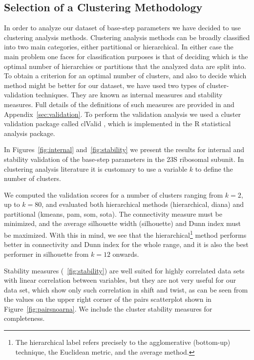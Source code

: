 \subsection{Selection of a Clustering Methodology} 
In  order to  analyze  our  dataset of  base-step  parameters we  have
decided  to  use  clustering  analysis methods.   Clustering  analysis
methods  can be broadly  classified into  two main  categories, either
partitional  or hierarchical.   In either  case the  main  problem one
faces for  classification purposes  is that of  deciding which  is the
optimal number of hierarchies or partitions that the analyzed data are
split into.  To obtain a  criterion for an optimal number of clusters,
and also  to decide which method  might be better for  our dataset, we
have used two types  of cluster-validation techniques.  They are known
as  internal measures  and stability  measures.  Full  details  of the
definitions  of   such  measures  are   provided  in  \cite{handl2005,
  brock2008}   and  Appendix~\ref{sec:validation}.   To   perform  the
validation  analysis  we  used  a cluster  validation  package  called
clValid \cite{brock2008},  which is implemented in  the R \cite{rcite}
statistical analysis package.

In  Figures~\ref{fig:internal} and~\ref{fig:stability} we  present the
results  for  internal  and  stability  validation  of  the  base-step
parameters  in  the  23S  ribosomal  subunit.  In  clustering  analysis
literature it is customary to use  a variable $k$ to define the number
of clusters.

We computed  the validation  scores for a  number of  clusters ranging
from  $k=2$, up  to $k=80$,  and evaluated  both  hierarchical methods
(hierarchical, diana)  and partitional (kmeans, pam,  som, sota).  The
connectivity  measure must  be minimized,  and the  average silhouette
width  (silhouette) and  Dunn index  must be  maximized.  With  this in
mind,  we see  that the  hierarchical\footnote{The  hierarchical label
  refers  precisely to  the agglomerative  (bottom-up)  technique, the
  Euclidean metric, and the average method.} method performs better in
connectivity and  Dunn index for the  whole range, and it  is also the
best performer in silhouette from $k=12$ onwards.

Stability measures  (~\ref{fig:stability}) are well  suited for highly
correlated data  sets with  linear correlation between  variables, but
they  are not  very useful  for  our data  set, which  show only  such
correlation in shift and twist, as  can be seen from the values on the
upper   right    corner   of   the   pairs    scatterplot   shown   in
Figure~\ref{fig:pairsnoarna}.    We  include  the   cluster  stability
measures for completeness.


